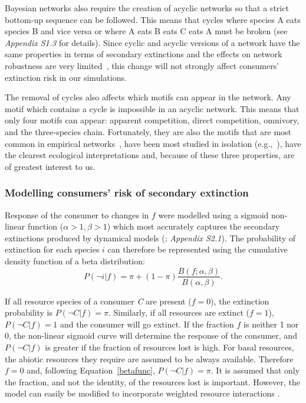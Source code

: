 \documentclass[12pt]{article}
\begin{document}
\begin{spacing}{2.0}
        
        Bayesian networks also require the creation of acyclic networks so that a strict bottom-up sequence can be followed. 
        This means that cycles where species A eats species B and vice versa or where A eats B eats C eats A must be broken (see \emph{Appendix S1.3} for details).
        Since cyclic and acyclic versions of a network have the same properties in terms of secondary extinctions and the effects on network robustness are very limited~\citep{Allesina2009functional}, this change will not strongly affect consumers' extinction risk in our simulations.

        
        The removal of cycles also affects which motifs can appear in the network. 
        Any motif which contains a cycle is impossible in an acyclic network.
        This means that only four motifs can appear: apparent competition, direct competition, omnivory, and the three-species chain.
        Fortunately, they are also the motifs that are most common in empirical networks~\citep{Stouffer2007}, have been most studied in isolation (e.g.,~\citealp[]{Bascompte2005,Kondoh2008,Laws2013}), have the clearest ecological interpretations and, because of these three properties, are of greatest interest to us.


        \subsubsection*{Modelling consumers' risk of secondary extinction} 
        
           Response of the consumer to changes in $f$ were modelled using a sigmoid non-linear function ($\alpha > 1, \beta > 1$) which most accurately captures the secondary extinctions produced by dynamical models (\citealp[]{Eklof2013}; \emph{Appendix S2.1}).
            The probability of extinction for each species $i$ can therefore be represented using the cumulative density function of a beta distribution:
    		\begin{equation}
    		P(\lnot i|f) = \pi + (1 - \pi) \frac{B(f;\alpha,\beta)}{B(\alpha,\beta)}.
    				\label{betafunc}
            \end{equation}
    		
            If all resource species of a consumer \textit{C} are present ($f = 0$), the extinction probability is $P(\lnot C|f) = \pi$. 
            Similarly, if all resources are extinct ($f = 1$), $P(\lnot C|f)=1$  and the consumer will go extinct.
            If the fraction $f$ is neither 1 nor 0, the non-linear sigmoid curve will determine the response of the consumer, and $P(\lnot C|f)$ is greater if the fraction of resources lost is high. 
            For basal resources, the abiotic resources they require are assumed to be always available.
            Therefore $f=0$ and, following Equation~\ref{betafunc}, $P(\lnot C|f) = \pi$.
            It is assumed that only the fraction, and not the identity, of the resources lost is important. 
            However, the model can easily be modified to incorporate weighted resource interactions \citep[see][]{Eklof2013}.
    		

\end{spacing}
\end{document}
